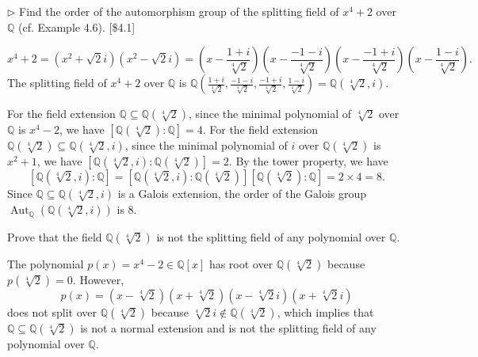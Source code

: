 \begin{problem}[4.3]
$\triangleright$ Find the order of the automorphism group of the splitting field of $x^4+2$ over $\mathbb{Q}$ (cf. Example 4.6). [\$4.1]
\end{problem}
\begin{solution}
\[
x^4+2=(x^2+\sqrt{2}i)(x^2-\sqrt{2}i)=\left(x-\frac{1+i}{\sqrt[4]{2}}\right)\left(x-\frac{-1-i}{\sqrt[4]{2}}\right)\left(x-\frac{-1+i}{\sqrt[4]{2}}\right)\left(x-\frac{1-i}{\sqrt[4]{2}}\right).
\]
The splitting field of $x^4+2$ over $\mathbb{Q}$ is $\mathbb{Q}\left(\frac{1+i}{\sqrt[4]{2}},\frac{-1-i}{\sqrt[4]{2}},\frac{-1+i}{\sqrt[4]{2}},\frac{1-i}{\sqrt[4]{2}}\right)=\mathbb{Q}\left(\sqrt[4]{2},i\right)$.

For the field extension $\mathbb{Q}\subseteq\mathbb{Q}(\sqrt[4]{2})$, since the minimal polynomial of $\sqrt[4]{2}$ over $\mathbb{Q}$ is $x^4-2$, we have $[\mathbb{Q}(\sqrt[4]{2}): \mathbb{Q}]=4$. For the field extension $\mathbb{Q}(\sqrt[4]{2})\subseteq\mathbb{Q}(\sqrt[4]{2},i)$, since the minimal polynomial of $i$ over $\mathbb{Q}(\sqrt[4]{2})$ is $x^2+1$, we have $[\mathbb{Q}(\sqrt[4]{2},i): \mathbb{Q}(\sqrt[4]{2})]=2$. By the tower property, we have 
\[
	[\mathbb{Q}(\sqrt[4]{2},i): \mathbb{Q}]=[\mathbb{Q}(\sqrt[4]{2},i): \mathbb{Q}(\sqrt[4]{2})][\mathbb{Q}(\sqrt[4]{2}): \mathbb{Q}]=2\times 4=8.
\]
Since $\mathbb{Q}\subseteq\mathbb{Q}(\sqrt[4]{2},i)$ is a Galois extension, the order of the Galois group $\operatorname{Aut}_{\mathbb{Q}}\left(\mathbb{Q}(\sqrt[4]{2},i)\right)$ is 8.
\end{solution}

\begin{problem}[4.4]
Prove that the field $\mathbb{Q}(\sqrt[4]{2})$ is not the splitting field of any polynomial over $\mathbb{Q}$.
\end{problem}
\begin{solution}
The polynomial $p(x)=x^4-2\in\mathbb{Q}[x]$ has root over $\mathbb{Q}(\sqrt[4]{2})$ because $p\left(\sqrt[4]{2}\right)=0$. However,
\[
p(x)=\left(x-\sqrt[4]{2}\right)\left(x+\sqrt[4]{2}\right)\left(x-\sqrt[4]{2}i\right)\left(x+\sqrt[4]{2}i\right)
\]
does not split over $\mathbb{Q}(\sqrt[4]{2})$ because $\sqrt[4]{2}i\notin \mathbb{Q}(\sqrt[4]{2})$, which implies that $\mathbb{Q}\subseteq\mathbb{Q}(\sqrt[4]{2})$ is not a normal extension and is not the splitting field of any polynomial over $\mathbb{Q}$.
\end{solution}